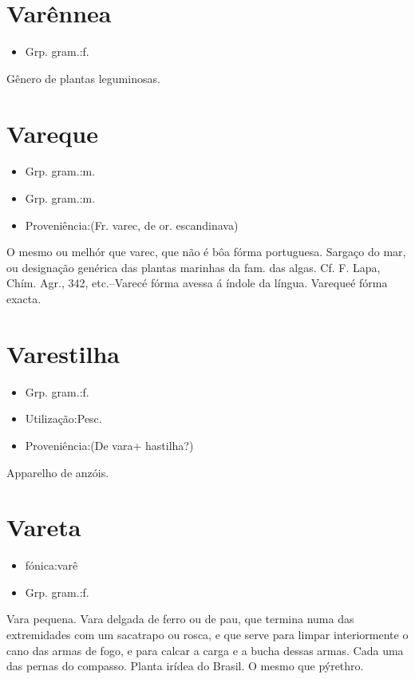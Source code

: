 \documentclass{article}
\begin{document}
\section{Varênnea}
\begin{itemize}
\item {Grp. gram.:f.}
\end{itemize}
Gênero de plantas leguminosas.
\section{Vareque}
\begin{itemize}
\item {Grp. gram.:m.}
\end{itemize}
\begin{itemize}
\item {Grp. gram.:m.}
\end{itemize}
\begin{itemize}
\item {Proveniência:(Fr. \textunderscore varec\textunderscore , de or. escandinava)}
\end{itemize}
O mesmo ou melhór que \textunderscore varec\textunderscore , que não é bôa fórma portuguesa.
Sargaço do mar, ou designação genérica das plantas marinhas da fam. das algas. Cf. F. Lapa, \textunderscore Chím. Agr.\textunderscore , 342, etc.--\textunderscore Varec\textunderscore  é fórma avessa á índole da língua. \textunderscore Vareque\textunderscore  é fórma exacta.
\section{Varestilha}
\begin{itemize}
\item {Grp. gram.:f.}
\end{itemize}
\begin{itemize}
\item {Utilização:Pesc.}
\end{itemize}
\begin{itemize}
\item {Proveniência:(De \textunderscore vara\textunderscore  + \textunderscore hastilha\textunderscore ?)}
\end{itemize}
Apparelho de anzóis.
\section{Vareta}
\begin{itemize}
\item {fónica:varê}
\end{itemize}
\begin{itemize}
\item {Grp. gram.:f.}
\end{itemize}
Vara pequena.
Vara delgada de ferro ou de pau, que termina numa das extremidades com um sacatrapo ou rosca, e que serve para limpar interiormente o cano das armas de fogo, e para calcar a carga e a bucha dessas armas.
Cada uma das pernas do compasso.
Planta irídea do Brasil.
O mesmo que \textunderscore pýrethro\textunderscore .
\end{document}
